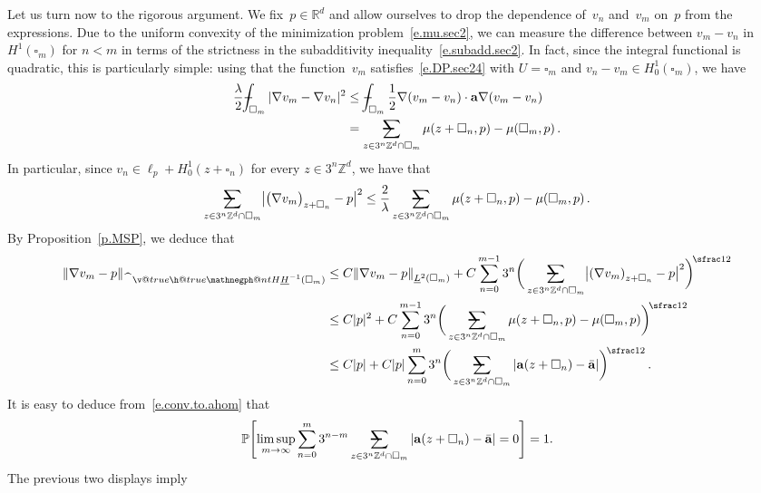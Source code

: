 \documentclass[11pt]{article} %
\makeatletter
\let\oldsquare\square %
\renewcommand{\square}{\oldsquare}
\numberwithin{equation}{section}
\theoremstyle{definition}
\let\originalleft\left
\let\originalright\right
\renewcommand{\left}{\mathopen{}\mathclose\bgroup\originalleft}
\renewcommand{\right}{\aftergroup\egroup\originalright}
\newcommand*{\Zd}{\ensuremath{\mathbb{Z}^d}}
\newcommand*{\Rd}{\ensuremath{\mathbb{R}^d}}
\renewcommand*{\hat}{\widehat}
\renewcommand{\a}{\mathbf{a}}
\newcommand{\ahom}{\bar{\a}}
\newcommand{\cu}{\square}
\renewcommand{\P}{\mathbb{P}}
\newcommand{\avsum}{\mathop{\mathpalette\avsuminner\relax}\displaylimits}
\newcommand\avsuminner[2]{%
  {\sbox0{$\m@th#1\sum$}%
   \vphantom{\usebox0}%
   \ooalign{%
     \hidewidth
     \smash{\,\rule[.23em]{8.8pt}{1.1pt} \relax}%
     \hidewidth\cr
     $\m@th#1\sum$\cr
   }%
  }%
}
\def\Xint#1{\mathchoice
{\XXint\displaystyle\textstyle{#1}}%
{\XXint\textstyle\scriptstyle{#1}}%
{\XXint\scriptstyle\scriptscriptstyle{#1}}%
{\XXint\scriptscriptstyle\scriptscriptstyle{#1}}%
\!\int}
\def\XXint#1#2#3{{\setbox0=\hbox{$#1{#2#3}{\int}$}
\vcenter{\hbox{$#2#3$}}\kern-.5\wd0}}
\def\fint{\Xint-}
\newcommand{\negphantom}{\v@true\h@true\negph@nt}
\newcommand{\negph@nt}{\ifmmode\expandafter\mathpalette 
  \expandafter\mathnegph@nt\else\expandafter\makenegph@nt\fi}
\newcommand{\makenegph@nt}[1]{%
  \setbox\z@\hbox{\color@begingroup#1\color@endgroup}\finnegph@nt}
\newcommand{\finnegph@nt}{%
  \setbox\tw@\null 
  \ifv@ \ht\tw@\ht\z@\dp\tw@\dp\z@\fi \ifh@\wd\tw@-\wd\z@\fi\box\tw@}
\newcommand{\mathnegph@nt}[2]{%
  \setbox\z@\hbox{$\m@th #1{#2}$}\finnegph@nt}
\newcommand{\Hminusul}{\hat{\phantom{H}}\negphantom{H}\underline{H}^{-1}}
\makeatother
\begin{document}
\smallskip

Let us turn now to the rigorous argument. We fix~$p\in\Rd$ and allow ourselves to drop the dependence of~$v_n$ and~$v_m$ on~$p$ from the expressions.
Due to the uniform convexity of the minimization problem~\eqref{e.mu.sec2}, we can measure the difference between $v_m-v_n$ in $H^1(\cu_m)$ for $n<m$ in terms of the strictness in the subadditivity inequality~\eqref{e.subadd.sec2}. 
In fact, since the integral functional is quadratic, this is particularly simple: using that the function~$v_m$ satisfies~\eqref{e.DP.sec24} with $U=\cu_m$ and $v_n-v_m\in H^1_0(\cu_m)$, we have
\begin{align}
\label{e.multiscale.snap}
\frac{\lambda}{2} \fint_{\cu_m} 
|\nabla v_m- \nabla v_n|^2
&
\leq 
\fint_{\cu_m} 
\frac12 \nabla (v_m-v_n) \cdot \a\nabla (v_m-v_n) 
\notag \\ &
=
\avsum_{z\in 3^n\Zd\cap \cu_m} 
\mu(z+\cu_n,p)
-
\mu(\cu_m,p) \,.
\end{align} 
In particular, since $v_n \in \ell_p+ H^1_0(z+\cu_n)$ for every $z\in 3^n\Zd$, we have that 
\begin{equation*}
\avsum_{z\in 3^n\Zd\cap \cu_m} 
\bigl| \bigl( \nabla v_m \bigr)_{z+\cu_n} - p \bigr|^2
\leq 
\frac{2}{\lambda} 
\avsum_{z\in 3^n\Zd\cap \cu_m} 
\mu(z+\cu_n,p)
-
\mu(\cu_m,p) \,.
\end{equation*}
By Proposition~\ref{p.MSP}, we deduce that 
\begin{align}
\label{e.flatnessqual.sec24}
\left\| \nabla v_m - p \right\|_{\Hminusul(\cu_m)}
&
\leq
C
\left\| \nabla v_m - p \right\|_{ \underline{L}^2(\cu_m)} 
+
C 
\sum_{n=0}^{{m-1}} 3^{n} 
\biggl( \, \avsum_{z\in 3^n\Zd\cap \cu_{m}} 
\left| \left( \nabla v_m  \right)_{z+\cu_n} - p \right|^2 \biggr)^{\!\sfrac12}
\notag \\ & 
\leq 
C|p|^2 
+ 
C 
\sum_{n=0}^{{m-1}} 3^{n} 
\biggl( \, \avsum_{z\in 3^n\Zd\cap \cu_{m}} 
\mu(z+\cu_n,p)
-
\mu(\cu_m,p) 
\biggr)^{\!\sfrac12}
\notag \\ & 
\leq 
C|p|
+ 
C |p|
\sum_{n=0}^{{m}} 3^{n} 
\biggl( \, \avsum_{z\in 3^n\Zd\cap \cu_{m}} 
| \a(z+\cu_n)
-
\ahom |
\biggr)^{\!\sfrac12}
\,.
\end{align}
It is easy to deduce from~\eqref{e.conv.to.ahom} that 
\begin{equation}
\label{e.multiscalequant.sec24}
\P \Biggl[
\limsup_{m\to\infty} 
\sum_{n=0}^{{m}} 3^{n-m} 
\avsum_{z\in 3^n\Zd\cap \cu_{m}} 
| \a(z+\cu_n)
-
\ahom |
= 0
\Biggr] = 1. 
\end{equation}
The previous two displays imply
\end{document}
